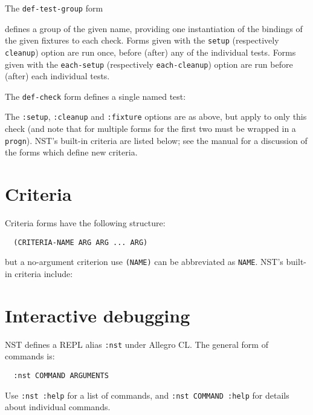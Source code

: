 \documentclass{article}
\newenvironment{criteria}%
{\begin{list}{}
    {\setlength{\labelwidth}{0pt}
     \setlength{\leftmargin}{2em}
     \setlength{\rightmargin}{1em}
     \setlength{\itemindent}{0em}}}%
  {\end{list}}
\def\criterion#1#2#3#4{\item[\bfseries #1] #4\par
  \emph{Syntax:}~~\texttt{#2}\\ \emph{Applicable to:}~~#3}
\begin{document}
The \texttt{def-test-group} form 

defines a group of the given name, providing one instantiation of the
bindings of the given fixtures to each check.  Forms given with the
\texttt{setup} (respectively \texttt{cleanup}) option are run once,
before (after) any of the individual tests.  Forms given with the
\texttt{each-setup} (respectively \texttt{each-cleanup}) option are
run before (after) each individual tests.

The \texttt{def-check} form defines a single named test:

The \texttt{:setup}, \texttt{:cleanup} and \texttt{:fixture} options
are as above, but apply to only this check (and note that for multiple
forms for the first two must be wrapped in a \texttt{progn}).  NST's
built-in criteria are listed below; see the manual for a discussion of
the forms which define new criteria.

\section*{Criteria}
Criteria forms have the following structure:
\begin{verbatim}
  (CRITERIA-NAME ARG ARG ... ARG)
\end{verbatim}
but a no-argument criterion use \texttt{(NAME)} can be abbreviated as
\texttt{NAME}.  NST's built-in criteria include:
\def\criteriaGroup#1{\par\textbf{#1.}\begin{criteria}}
\def\endcriteriaGroup{\end{criteria}}
\def\criteriaDoc#1#2#3#4#5#6#7#8{\criterion{#2}{#3}{#5}{#4}}
\def\noExpl{}
\def\hasExpl#1{}


\section*{Interactive debugging}
NST defines a REPL alias \texttt{:nst} under Allegro CL.  The general
form of commands is:
\begin{verbatim}
  :nst COMMAND ARGUMENTS
\end{verbatim}
Use \mbox{\texttt{:nst :help}} for a list of commands, and
\mbox{\texttt{:nst COMMAND :help}} for details about individual
commands.
\end{document}
